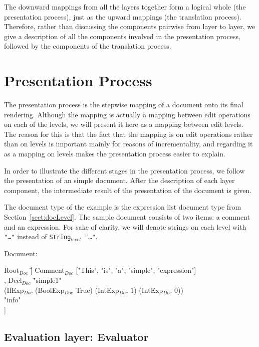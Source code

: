 The downward mappings from all the layers together form a logical whole (the presentation process), just as the upward mappings (the translation process). Therefore, rather than discussing the components pairwise from layer to layer, we give a description of all the components involved in the presentation process, followed by the components of the translation process.


%																
%																
%																
\section{Presentation Process} \label{sect:presprocess}

The presentation process is the stepwise mapping of a document onto its final rendering. Although the mapping is actually a mapping between edit operations on each of the levels, we will present it here as a mapping between edit levels. The reason for this is that the fact that the mapping is on edit operations rather than on levels is important mainly for reasons of incrementality, and regarding it as a mapping on levels makes the presentation process easier to explain.

In order to illustrate the different stages in the presentation process, we follow the presentation of an simple document. After the description of each layer component, the intermediate result of the presentation of the document is given.

The document type of the example is the expression list document type from Section~\ref{sect:docLevel}. The sample document consists of two items: a comment and an expression. For sake of clarity, we will denote strings on each level with {\tt "\dots"} instead of {\tt String$_{level}$ "\dots"}. 

Document:
\small \ttfamily
\begin{tabbing}
Root$_{Doc}$ \= [ Comment$_{Doc}$ ["This", "is", "a", "simple", "expression"] \\
       \> , Decl$_{Doc}$ \= "simple1" \\
       \>                        \>(IfExp$_{Doc}$ (BoolExp$_{Doc}$ True) (IntExp$_{Doc}$ 1) (IntExp$_{Doc}$ 0))\\
       \>                        \> "info"\\
       \> ] 
\end{tabbing}
\rmfamily \normalsize


%																
\subsection{Evaluation layer: Evaluator} \label{sect:evaluator}

